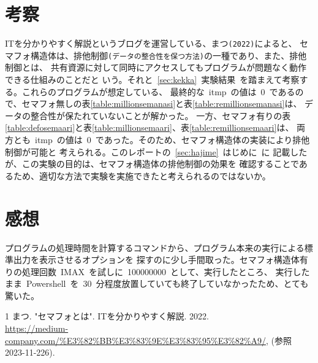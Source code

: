 \documentclass[10pt]{jarticle}
\begin{document}
\newpage
\section{考察}
ITを分かりやすく解説というブログを運営している、まつ\verb|(2022)|によると、
セマフォ構造体は、排他制御\verb|(データの整合性を保つ方法)|の一種であり、また、排他制御とは、
共有資源に対して同時にアクセスしてもプログラムが問題なく動作できる仕組みのことだと
いう\cite{semaphore}。それと\ \ref{sec:kekka}\ 実験結果\ を踏まえて考察する。これらのプログラムが想定している、
最終的な\ itmp\ の値は\ 0\ であるので、セマフォ無しの表\ref{table:millionsemanasi}と表\ref{table:remillionsemanasi}は、
データの整合性が保たれていないことが解かった。
一方、セマフォ有りの表\ref{table:defosemaari}と表\ref{table:millionsemaari}、表\ref{table:remillionsemaari}は、
両方とも\ itmp\ の値は\ 0\ であった。そのため、セマフォ構造体の実装により排他制御が可能と
考えられる。このレポートの\ \ref{sec:hajime}\ はじめに\ に
記載したが、この実験の目的は、セマフォ構造体の排他制御の効果を
確認することであるため、適切な方法で実験を実施できたと考えられるのではないか。

\section{感想}

プログラムの処理時間を計算するコマンドから、プログラム本来の実行による標準出力を表示させるオプションを
探すのに少し手間取った。セマフォ構造体有りの処理回数\ IMAX\ を試しに\ 100000000\ として、実行したところ、
実行したまま\ Powershell\ を\ 30\ 分程度放置していても終了していなかったため、とても驚いた。

\newpage
\begin{thebibliography}{1}
    まつ. "セマフォとは". ITを分かりやすく解説. 2022. \\
    \url{https://medium-company.com/%E3%82%BB%E3%83%9E%E3%83%95%E3%82%A9/}, (参照 2023-11-226).
\end{thebibliography}
\end{document}

